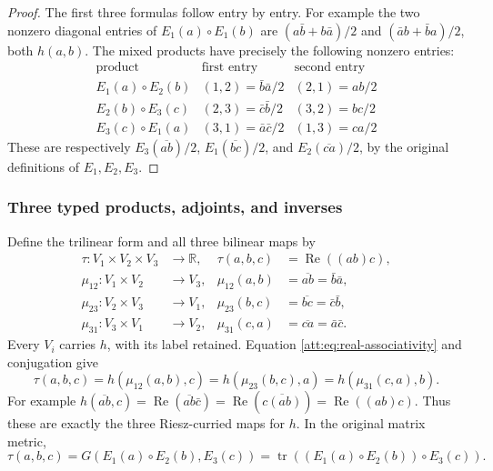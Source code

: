 \documentclass[11pt]{article}
\theoremstyle{definition}
\begin{document}
\begin{proof}
The first three formulas follow entry by entry. For example the two
nonzero diagonal entries of $E_1(a)\circ E_1(b)$ are
$(a\bar b+b\bar a)/2$ and $(\bar a b+\bar b a)/2$, both $h(a,b)$.
The mixed products have precisely the following nonzero entries:
\[
\begin{array}{c|c|c}
\text{product}&\text{first entry}&\text{second entry}\\\hline
E_1(a)\circ E_2(b)&(1,2)=\bar b\bar a/2&(2,1)=ab/2\\
E_2(b)\circ E_3(c)&(2,3)=\bar c\bar b/2&(3,2)=bc/2\\
E_3(c)\circ E_1(a)&(3,1)=\bar a\bar c/2&(1,3)=ca/2
\end{array}
\]
These are respectively $E_3(\overline{ab})/2$,
$E_1(\overline{bc})/2$, and $E_2(\overline{ca})/2$, by the original
definitions of $E_1,E_2,E_3$.
\end{proof}

\subsubsection{Three typed products, adjoints, and inverses}

Define the trilinear form and all three bilinear maps by
\begin{align}
 \tau:V_1\times V_2\times V_3&\longrightarrow\mathbb R,&
 \tau(a,b,c)&=\operatorname{Re}((ab)c),\label{att:eq:tau}\\
 \mu_{12}:V_1\times V_2&\longrightarrow V_3,&
 \mu_{12}(a,b)&=\overline{ab}=\bar b\bar a,\nonumber\\
 \mu_{23}:V_2\times V_3&\longrightarrow V_1,&
 \mu_{23}(b,c)&=\overline{bc}=\bar c\bar b,\nonumber\\
 \mu_{31}:V_3\times V_1&\longrightarrow V_2,&
 \mu_{31}(c,a)&=\overline{ca}=\bar a\bar c.\nonumber
\end{align}
Every $V_i$ carries $h$, with its label retained. Equation
\eqref{att:eq:real-associativity} and conjugation give
\begin{equation}
 \tau(a,b,c)=h(\mu_{12}(a,b),c)
 =h(\mu_{23}(b,c),a)=h(\mu_{31}(c,a),b).
 \label{att:eq:riesz}
\end{equation}
For example $h(\overline{ab},c)=
\operatorname{Re}(\overline{ab}\bar c)=
\operatorname{Re}(\overline{c(ab)})=\operatorname{Re}((ab)c)$.
Thus these are exactly the three Riesz-curried maps for $h$.
In the original matrix metric,
\begin{equation}
 \tau(a,b,c)=G(E_1(a)\circ E_2(b),E_3(c))
 =\operatorname{tr}((E_1(a)\circ E_2(b))\circ E_3(c)).
 \label{att:eq:tau-jordan}
\end{equation}
\end{document}
